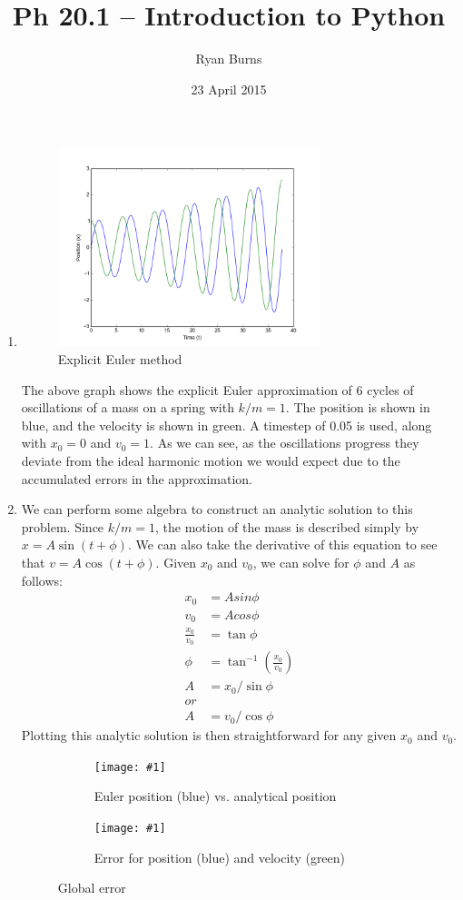 \documentclass[11pt]{article}
\title{Ph 20.1 -- Introduction to Python}
\author{Ryan Burns}
\date{23 April 2015}
\newcommand{\medgraph}[2]
{\begin{subfigure}[h]{3in}
	\texttt{[image: \#1]}
	\caption{#2}
	\label{fig:#1}
\end{subfigure}}
\begin{document}
\maketitle
\begin{enumerate}
\item
\begin{figure}[h]
\centering
\includegraphics[width=3in]{img/explicit.png}
\caption{Explicit Euler method}
\end{figure}
The above graph shows the explicit Euler approximation of 6 cycles of oscillations of a mass on a spring with $k/m = 1$. The position is shown in blue, and the velocity is shown in green. A timestep of 0.05 is used, along with $x_0 = 0$ and $v_0 = 1$. As we can see, as the oscillations progress they deviate from the ideal harmonic motion we would expect due to the accumulated errors in the approximation.

\item
We can perform some algebra to construct an analytic solution to this problem. Since $k/m = 1$, the motion of the mass is described simply by $x = A \sin (t + \phi)$. We can also take the derivative of this equation to see that $v = A \cos (t + \phi)$. Given $x_0$ and $v_0$, we can solve for $\phi$ and $A$ as follows:
\begin{align*}
x_0 &= A sin \phi \\
v_0 &= A cos \phi \\
\frac{x_0}{v_0} &= \tan \phi \\
\phi &= \tan^{-1} \left( \frac{x_0}{v_0} \right) \\
A &= x_0 / \sin \phi \\
or \\
A &= v_0 / \cos \phi
\end{align*}
Plotting this analytic solution is then straightforward for any given $x_0$ and $v_0$.
\begin{figure}[h]
\centering
\medgraph{img/diff.png}{Euler position (blue) vs. analytical position}
\medgraph{img/error.png}{Error for position (blue) and velocity (green)}
\caption{Global error}
\end{figure}


\end{enumerate}
\end{document}

